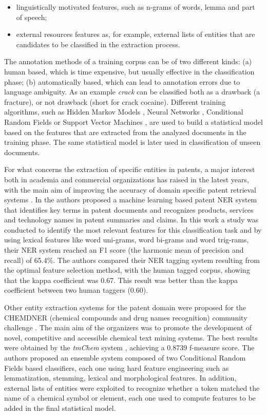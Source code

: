 \documentclass[b5paper,]{book}
\providecommand{\tightlist}{%
  \setlength{\itemsep}{0pt}\setlength{\parskip}{0pt}}
\theoremstyle{definition}
\theoremstyle{definition}
\theoremstyle{definition}
\theoremstyle{remark}
\begin{document}
\begin{itemize}
\tightlist
\item
  linguistically motivated features, such as n-grams of words, lemma and
  part of speech;
\item
  external resources features as, for example, external lists of
  entities that are candidates to be classified in the extraction
  process.
\end{itemize}

The annotation methods of a training corpus can be of two different
kinds: (a) human based, which is time expensive, but usually effective
in the classification phase; (b) automatically based, which can lead to
annotation errors due to language ambiguity. As an example \emph{crack}
can be classified both as a drawback (a fracture), or not drawback
(short for crack cocaine). Different training algorithms, such as Hidden
Markov Models \citep{hmm}, Neural Networks \citep{nnet}, Conditional
Random Fields \citep{crf} or Support Vector Machines \citep{svm}, are
used to build a statistical model based on the features that are
extracted from the analyzed documents in the training phase. The same
statistical model is later used in classification of unseen documents.

For what concerns the extraction of specific entities in patents, a
major interest both in academia and commercial organizations has raised
in the latest years, with the main aim of improving the accuracy of
domain specific patent retrieval systems \citep{chemdner}. In
\citep{lee-ner13} the authors proposed a machine learning based patent
NER system that identifies key terms in patent documents and recognizes
products, services and technology names in patent summaries and claims.
In this work a study was conducted to identify the most relevant
features for this classification task and by using lexical features like
word uni-grams, word bi-grams and word trig-rams, their NER system
reached an F1 score (the harmonic mean of precision and recall) of
65.4\%. The authors compared their NER tagging system resulting from the
optimal feature selection method, with the human tagged corpus, showing
that the kappa coefficient was 0.67. This result was better than the
kappa coefficient between two human taggers (0.60).

Other entity extraction systems for the patent domain were proposed for
the CHEMDNER (chemical compounds and drug names recognition) community
challenge \citep{chemdner}. The main aim of the organizers was to
promote the development of novel, competitive and accessible chemical
text mining systems. The best results were obtained by the \emph{tmChem}
system \citep{leaman2015}, achieving a 0.8739 f-measure score. The
authors proposed an ensemble system composed of two Conditional Random
Fields based classifiers, each one using hard feature engineering such
as lemmatization, stemming, lexical and morphological features. In
addition, external lists of entities were exploited to recognize whether
a token matched the name of a chemical symbol or element, each one used
to compute features to be added in the final statistical model.
\end{document}
